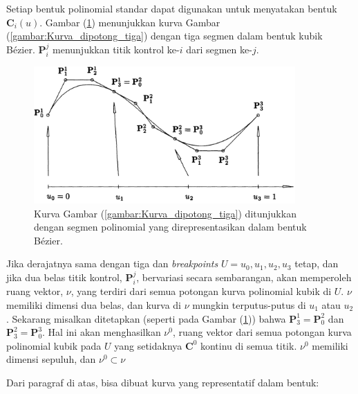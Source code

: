 Setiap bentuk polinomial standar dapat digunakan 
untuk menyatakan bentuk $\textbf{C}_{i}(u)$. 
Gambar (\ref{gambar:Kurva_dipotong_tiga_dipotong_lagi}) 
menunjukkan kurva Gambar (\ref{gambar:Kurva_dipotong_tiga}) 
dengan tiga segmen  dalam bentuk kubik Bézier. 
$\textbf{P}_i^j$ menunjukkan titik kontrol ke-$i$ dari segmen ke-$j$.
\begin{figure}[H]
	\centering
	\includegraphics[keepaspectratio, width=10cm]{gambar/Interpolasi/pic2.png} 
	\caption{Kurva Gambar (\ref{gambar:Kurva_dipotong_tiga}) 
	ditunjukkan dengan segmen polinomial yang direpresentasikan 
	dalam bentuk Bézier.}
	\label{gambar:Kurva_dipotong_tiga_dipotong_lagi}
\end{figure}

Jika derajatnya sama dengan tiga dan \textit{breakpoints} 
$U = {u_0, u_1, u_2, u_3}$ tetap, dan jika dua 
belas titik kontrol, $\textbf{P}_i^j $, bervariasi 
secara sembarangan, akan memperoleh ruang vektor, $\nu$, 
yang terdiri dari semua potongan kurva polinomial 
kubik di $U$. $\nu$ memiliki dimensi dua belas, dan kurva 
di $\nu$ mungkin terputus-putus di $u_1$ atau $u_2$. 
Sekarang misalkan ditetapkan (seperti pada 
Gambar (\ref{gambar:Kurva_dipotong_tiga_dipotong_lagi})) 
bahwa $\textbf{P}_3^1 = \textbf{P}_0^2$ 
dan $\textbf{P}_3^2 = \textbf{P}_0^3$. Hal ini 
akan menghasilkan $\nu^0$, ruang vektor dari semua 
potongan kurva polinomial kubik pada $U$ yang 
setidaknya $\textbf{C}^0$ kontinu di semua titik. $\nu^0$ memiliki 
dimensi sepuluh, dan $\nu^0 \subset \nu$

Dari paragraf di atas, bisa dibuat kurva yang 
representatif dalam bentuk:

